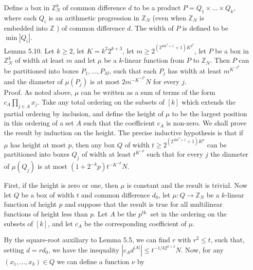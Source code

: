\documentclass[10pt]{article}
\begin{document}
Define a box in $\mathbb{Z}_{N}^{k}$ of common difference $d$ to be a product $P=Q_{1} \times \ldots \times Q_{k}$, where each $Q_{i}$ is an arithmetic progression in $\mathbb{Z}_{N}$ (even when $\mathbb{Z}_{N}$ is\\
embedded into $\mathbb{Z}$ ) of common difference $d$. The width of $P$ is defined to be $\min \left|Q_{i}\right|$.\\
Lemma 5.10. Let $k \geqslant 2$, let $K=k^{2} 2^{k+3}$, let $m \geqslant 2^{\left(2^{40 k^{3}+1}+1\right)K^{2^{k}}}$, let $P$ be a box in $\mathbb{Z}_{N}^{k}$ of width at least $m$ and let $\mu$ be a $k$-linear function from $P$ to $\mathbb{Z}_{N}$. Then $P$ can be partitioned into boxes $P_{1}, \ldots, P_{M}$, such that each $P_{j}$ has width at least $m^{K^{-2^{k}}}$ and the diameter of $\mu\left(P_{j}\right)$ is at most $2 m^{-K^{-2^{k}}} N$ for every $j$.\\
Proof. As noted above, $\mu$ can be written as a sum of terms of the form $c_{A} \prod_{j \in A} x_{j}$. Take any total ordering on the subsets of $[k]$ which extends the partial ordering by inclusion, and define the height of $\mu$ to be the largest position in this ordering of a set $A$ such that the coefficient $c_{A}$ is non-zero. We shall prove the result by induction on the height. The precise inductive hypothesis is that if $\mu$ has height at most $p$, then any box $Q$ of width $t \geqslant 2^{\left(2^{40 k^{3}+1}+1\right)K^{p}}$ can be partitioned into boxes $Q_{j}$ of width at least $t^{K^{-p}}$ such that for every $j$ the diameter of $\mu\left(Q_{j}\right)$ is at most $\left(1+2^{-k} p\right) t^{-K^{-p}} N$.

First, if the height is zero or one, then $\mu$ is constant and the result is trivial. Now let $Q$ be a box of width $t$ and common difference $d_{0}$, let $\mu: Q \rightarrow \mathbb{Z}_{N}$ be a $k$-linear function of height $p$ and suppose that the result is true for all multilinear functions of height less than $p$. Let $A$ be the $p^{\text {th }}$ set in the ordering on the subsets of $[k]$, and let $c_{A}$ be the corresponding coefficient of $\mu$.

By the square-root auxiliary to Lemma 5.5, we can find $r$ with $r^{2}\leqslant t$, such that, setting $d=r d_{0}$, we have the inequality $\left|c_{A} d^{|A|}\right| \leqslant t^{-1 / k 2^{k+2}} N$. Now, for any $\left(x_{1}, \ldots, x_{k}\right) \in Q$ we can define a function $\nu$ by
\end{document}
